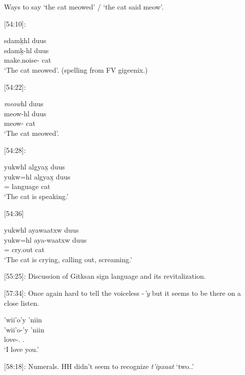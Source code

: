 \documentclass{article}
\begin{document}
Ways to say `the cat meowed' / `the cat said meow'.

[54:10]:
\begin{exe} \ex 
    \glll 
    sdamḵhl duus \\
    sdamḵ-hl duus \\
    make.noise-\Cn{} cat \\
    \glt `The cat meowed'. (spelling from FV gigeenix.)
\end{exe}

[54:22]:
\begin{exe} \ex 
    \glll 
    \textit{meow}hl duus \\
    meow-hl duus \\
    meow-\Cn{} cat \\
    \glt `The cat meowed'.
\end{exe}

[54:28]:
\begin{exe}
    \ex \glll
    yukwhl algyax̱ duus \\
    yukw=hl algyax̱ duus \\
    \Prog{}=\Cn{} language cat \\
    \glt `The cat is speaking.'
\end{exe}

[54:36]
\begin{exe}
    \ex \glll
    yukwhl ayawaatxw duus \\
    yukw=hl aya-waatxw duus \\
    \Prog{}=\Cn{} cry.out cat \\
    \glt `The cat is crying, calling out, screaming.'
\end{exe}

[55:25]: Discussion of Gitksan  sign language and its revitalization.

[57:34]: Once again hard to tell the voiceless -\textit{'y} but it seems to be there on a close listen.
\begin{exe}
    \ex \glll
    'wii'o'y 'niin \\
    'wii'o-'y 'niin \\
    love-\Fsg.\Ii{} \Ssg.\Iii \\
    \glt `I love you.'
\end{exe}

[58:18]: Numerals. HH didn't seem to recognize \textit{t'ipxaat} `two.\Anim{}.' 

\begin{exe}
\end{exe}
\end{document}
